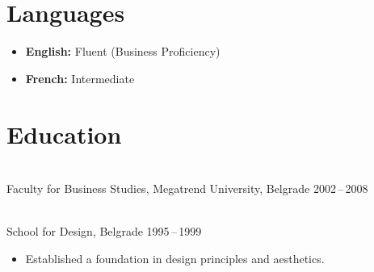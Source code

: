 \documentclass[a4paper,9.5pt]{article}
\begin{document}
\section{Languages}

\begin{itemize}[leftmargin=1.2em, label={•},
    topsep=0pt, itemsep=2pt, parsep=0pt]
  \item {\small\textbf{English:} Fluent (Business Proficiency)}
  \item {\small\textbf{French:} Intermediate}
\end{itemize}

\section{Education}

\\[1pt]
{\small\color{midgray}Faculty for Business Studies,
Megatrend University, Belgrade \hfill 2002\,--\,2008}

\vspace{6pt}

\\[1pt]
{\small\color{midgray}School for Design, Belgrade
\hfill 1995\,--\,1999}
\begin{itemize}[leftmargin=1.2em, label={•},
    topsep=2pt, itemsep=0pt, parsep=0pt]
  \item {\small Established a foundation in design principles
        and aesthetics.}
\end{itemize}
\end{document}
